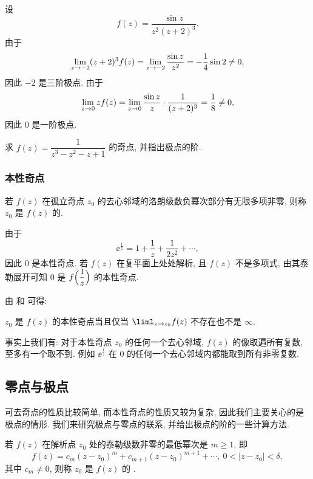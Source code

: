 \begin{example}
  设
  \[
    f(z)=\frac{\sin z}{z^2(z+2)^3}.
  \]
  由于
  \[
     \lim_{z\rightarrow -2}(z+2)^3f(z)
    =\lim_{z\rightarrow -2}\frac{\sin z}{z^2}
    =-\frac14\sin 2\neq0,
  \]
  因此 $-2$ 是三阶极点.
  由于
  \[
     \lim_{z\rightarrow 0}zf(z)
    =\lim_{z\rightarrow 0}\frac{\sin z}z\cdot\frac1{(z+2)^3}
    =\frac18\neq0,
  \]
  因此 $0$ 是一阶极点.
\end{example}

\begin{exercise}
  求 $f(z)=\dfrac1{z^3-z^2-z+1}$ 的奇点, 并指出极点的阶.
\end{exercise}


\subsubsection{本性奇点}

\begin{definition}
  若 $f(z)$ 在孤立奇点 $z_0$ 的去心邻域的洛朗级数负幂次部分有无限多项非零, 则称 $z_0$ 是 $f(z)$ 的.
\end{definition}

\begin{example}
  由于
  \[
    \ee^{\frac1z}=1+\frac1z+\frac1{2z^2}+\cdots,
  \]
  因此 $0$ 是本性奇点.
  若 $f(z)$ 在复平面上处处解析, 且 $f(z)$ 不是多项式, 由其泰勒展开可知 $0$ 是 $f\Bigl(\dfrac1z\Bigr)$ 的本性奇点.
\end{example}

由 和 可得:
\begin{theorem}
  $z_0$ 是 $f(z)$ 的本性奇点当且仅当 $\liml_{z\ra z_0}f(z)$ 不存在也不是 $\infty$.
\end{theorem}

事实上我们有: 对于本性奇点 $z_0$ 的任何一个去心邻域, $f(z)$ 的像取遍所有复数, 至多有一个取不到.
例如 $\ee^{\frac1z}$ 在 $0$ 的任何一个去心邻域内都能取到所有非零复数.


\subsection{零点与极点}

可去奇点的性质比较简单, 而本性奇点的性质又较为复杂, 因此我们主要关心的是极点的情形.
我们来研究极点与零点的联系, 并给出极点的阶的一些计算方法.

\begin{definition}
  \label{def:zero-order}
  若 $f(z)$ 在解析点 $z_0$ 处的泰勒级数非零的最低幂次是 $m\ge1$, 即
  \[
    f(z)=c_m(z-z_0)^m+c_{m+1}(z-z_0)^{m+1}+\cdots,\ 0<|z-z_0|<\delta,
  \]
  其中 $c_m\neq 0$, 则称 $z_0$ 是 $f(z)$ 的 .\footnotemark
\end{definition}

